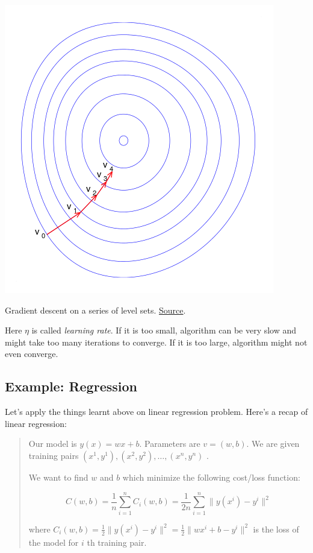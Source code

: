 \documentclass[a4paper]{tufte-handout}
\begin{document}
\begin{marginfigure}
  \includegraphics[width=\linewidth]{Gradient_descent}
  \caption{Gradient descent on a series of level sets.
  \href{https://en.wikipedia.org/wiki/Gradient_descent}{Source}.}
\end{marginfigure}

Here \(\eta\) is called \emph{learning rate}. If it is too small,
algorithm can be very slow and might take too many iterations to
converge. If it is too large, algorithm might not even converge.

\subsection{Example: Regression}\label{example-regression}

Let's apply the things learnt above on linear regression problem. Here's
a recap of linear regression:

\begin{quote}
Our model is \(y(x) = wx + b\). Parameters are \(v = (w, b)\). We are
given training pairs \((x^1, y^1), (x^2, y^2), \ldots, (x^n, y^n)\)
.

We want to find \(w\) and \(b\) which minimize the following cost/loss
function:

\[ C(w, b) = \frac{1}{n} \sum_{i = 1}^{n} C_i(w, b) = \frac{1}{2n} \sum_{i = 1}^{n} \| y(x^i) - y^i\|^2 \]

where
\(C_i(w, b) = \frac{1}{2} \| y(x^i) - y^i\|^2 = \frac{1}{2} \| wx^i + b - y^i\|^2\)
is the loss of the model for \(i\) th training pair.
\end{quote}
\end{document}
